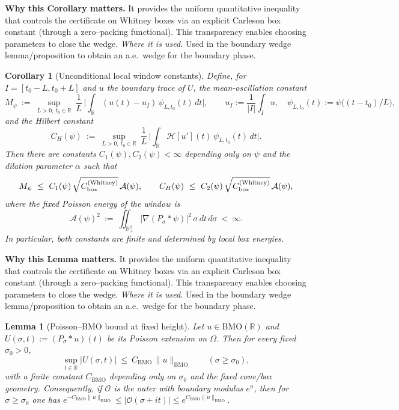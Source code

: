 \documentclass[11pt]{article}
\newtheorem{lemma}{Lemma}[section]
\newtheorem{corollary}{Corollary}[section]
\theoremstyle{definition}
\theoremstyle{remark}
\newcommand{\R}{\mathbb{R}}
\begin{document}
\vspace{1.0cm}
\noindent\textbf{Why this Corollary matters.} It provides the uniform quantitative inequality that controls the certificate on Whitney boxes via an explicit Carleson box constant (through a zero--packing functional). This transparency enables choosing parameters to close the wedge.
\noindent\textit{Where it is used.} Used in the boundary wedge lemma/proposition to obtain an a.e.\ wedge for the boundary phase.
\begin{corollary}[Unconditional local window constants]\label{cor:CH-Mpsi-final}
Define, for $I=[t_0-L,t_0+L]$ and $u$ the boundary trace of $U$, the mean-oscillation constant
\[
  M_\psi\ :=\ \sup_{L>0,\ t_0\in\R}\ \frac{1}{L}\,\Big|\int_{\R} (u(t)-u_I)\,\psi_{L,t_0}(t)\,dt\Big|,\qquad u_I:=\frac{1}{|I|}\int_I u,\quad \psi_{L,t_0}(t):=\psi\big((t-t_0)/L\big),
\]
and the Hilbert constant
\[
  C_H(\psi)\ :=\ \sup_{L>0,\ t_0\in\R}\ \frac{1}{L}\,\Big|\int_{\R} \mathcal H[u'](t)\,\psi_{L,t_0}(t)\,dt\Big|.
\]
Then there are constants $C_1(\psi),C_2(\psi)<\infty$ depending only on $\psi$ and the dilation parameter $\alpha$ such that
\[
  M_\psi\ \le\ C_1(\psi)\,\sqrt{C_{\rm box}^{(\mathrm{Whitney})}}\,\mathcal A(\psi),\qquad
  C_H(\psi)\ \le\ C_2(\psi)\,\sqrt{C_{\rm box}^{(\mathrm{Whitney})}}\,\mathcal A(\psi),
\]
where the fixed Poisson energy of the window is
\[
  \mathcal A(\psi)^2\ :=\ \iint_{\R^2_+}|\nabla(P_\sigma*\psi)|^2\,\sigma\,dt\,d\sigma\ <\ \infty.
\]
In particular, both constants are finite and determined by local box energies.
\end{corollary}





\vspace{1.0cm}
\noindent\textbf{Why this Lemma matters.} It provides the uniform quantitative inequality that controls the certificate on Whitney boxes via an explicit Carleson box constant (through a zero--packing functional). This transparency enables choosing parameters to close the wedge.
\noindent\textit{Where it is used.} Used in the boundary wedge lemma/proposition to obtain an a.e.\ wedge for the boundary phase.
\begin{lemma}[Poisson–BMO bound at fixed height]
\label{lem:poisson-bmo-strip}
Let $u\in \mathrm{BMO}(\mathbb R)$ and $U(\sigma,t):=(P_\sigma*u)(t)$ be its Poisson extension on $\Omega$. Then for every fixed $\sigma_0>0$,
\[
\sup_{t\in\mathbb R}|U(\sigma,t)|\ \le\ C_{\mathrm{BMO}}\,\|u\|_{\mathrm{BMO}}\qquad(\sigma\ge \sigma_0),
\]
with a finite constant $C_{\mathrm{BMO}}$ depending only on $\sigma_0$ and the fixed cone/box geometry. Consequently, if $\mathcal O$ is the outer with boundary modulus $e^u$, then for $\sigma\ge \sigma_0$ one has $e^{-C_{\mathrm{BMO}}\|u\|_{\mathrm{BMO}}}\le |\mathcal O(\sigma+it)|\le e^{C_{\mathrm{BMO}}\|u\|_{\mathrm{BMO}}}$.
\end{lemma}
\end{document}
